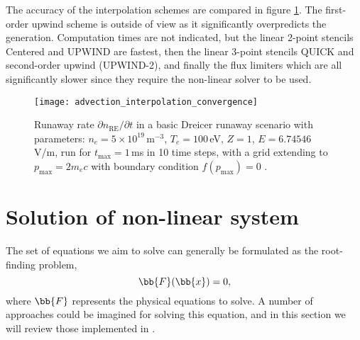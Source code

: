 \documentclass{notes}
\begin{document}
    The accuracy of the interpolation schemes are compared in figure \ref{fig:advection interpolation convergence}.
    The first-order upwind scheme is outside of view as it significantly overpredicts the generation. Computation times 
    are not indicated, but the linear 2-point stencils Centered and UPWIND are fastest, then the linear 3-point stencils 
    QUICK and second-order upwind (UPWIND-2), and finally the flux limiters which are all significantly slower since 
    they require the non-linear solver to be used.
    
    \begin{figure}
    \begin{center}
    \texttt{[image: advection\_interpolation\_convergence]}
    \caption{\label{fig:advection interpolation convergence} Runaway rate $\partial n_\mathrm{RE}/\partial t$ in 
    a basic Dreicer runaway scenario with parameters: $n_e = 5\times 10^{19}\,$m$^{-3}$, $T_e = 100\,$eV, $Z=1$, 
    $E=6.74546\,$V/m, run for $t_\mathrm{max}=1$\,ms in 10 time steps, with a grid extending to 
    $p_\mathrm{max} = 2m_e c$ with boundary condition $f(p_\mathrm{max})=0$ .}
    \end{center}
    \end{figure}
    \section{Solution of non-linear system}
    The set of equations we aim to solve can generally be formulated as the
    root-finding problem,
    \begin{equation}\label{eq:nonlinear}
        \bb{F}(\bb{x}) = 0,
    \end{equation}
    where $\bb{F}$ represents the physical equations to solve. A number of
    approaches could be imagined for solving this equation, and in this section
    we will review those implemented in \DREAM.
\end{document}
